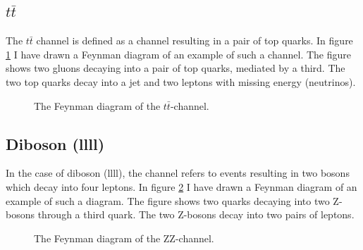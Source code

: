\subsection{$t\bar{t}$}
The $t\bar{t}$ channel is defined as a channel resulting in a pair of top quarks. In figure
\ref{fig:ttbar} I have drawn a Feynman diagram of an example of such a channel. The figure 
shows two gluons decaying into a pair of top quarks, mediated by a third. The two top quarks 
decay into a jet and two leptons with missing energy (neutrinos). 
\begin{figure}
    \centering
    \caption{The Feynman diagram of the $t\bar{t}$-channel.}
    \label{fig:ttbar}
\end{figure}

\subsection{Diboson (llll)}
In the case of diboson (llll), the channel refers to events resulting in two bosons which decay 
into four leptons. In figure \ref{fig:zz} I have drawn a Feynman diagram of an example of 
such a diagram. The figure shows two quarks decaying into two Z-bosons through a third quark.
The two Z-bosons decay into two pairs of leptons. 
\begin{figure}
    \centering
    \caption{The Feynman diagram of the ZZ-channel.}
    \label{fig:zz}
\end{figure}



